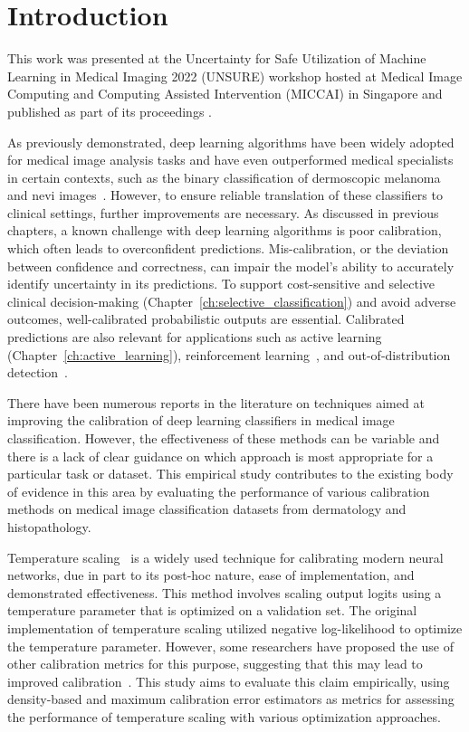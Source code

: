 \section{Introduction}
\label{sec:calibration_introduction}
This work was presented at the Uncertainty for Safe Utilization of Machine Learning in Medical Imaging 2022 (UNSURE) workshop hosted at Medical Image Computing and Computing Assisted Intervention (MICCAI) in Singapore and published as part of its proceedings \citep{carse2022calibration}.

As previously demonstrated, deep learning algorithms have been widely adopted for medical image analysis tasks and have even outperformed medical specialists in certain contexts, such as the binary classification of dermoscopic melanoma and nevi images~\citep{maron2019systematic}. However, to ensure reliable translation of these classifiers to clinical settings, further improvements are necessary. As discussed in previous chapters, a known challenge with deep learning algorithms is poor calibration, which often leads to overconfident predictions. Mis-calibration, or the deviation between confidence and correctness, can impair the model's ability to accurately identify uncertainty in its predictions. To support cost-sensitive and selective clinical decision-making (Chapter~\ref{ch:selective_classification}) and avoid adverse outcomes, well-calibrated probabilistic outputs are essential. Calibrated predictions are also relevant for applications such as active learning (Chapter~\ref{ch:active_learning}), reinforcement learning~\citep{dai2020federated}, and out-of-distribution detection~\citep{ulmer2020trust}.

There have been numerous reports in the literature on techniques aimed at improving the calibration of deep learning classifiers in medical image classification. However, the effectiveness of these methods can be variable and there is a lack of clear guidance on which approach is most appropriate for a particular task or dataset. This empirical study contributes to the existing body of evidence in this area by evaluating the performance of various calibration methods on medical image classification datasets from dermatology and histopathology.

Temperature scaling~\cite{guo2017calibration} is a widely used technique for calibrating modern neural networks, due in part to its post-hoc nature, ease of implementation, and demonstrated effectiveness. This method involves scaling output logits using a temperature parameter that is optimized on a validation set. The original implementation of temperature scaling utilized negative log-likelihood to optimize the temperature parameter. However, some researchers have proposed the use of other calibration metrics for this purpose, suggesting that this may lead to improved calibration~\cite{mukhoti2020calibrating,frenkel2021network}. This study aims to evaluate this claim empirically, using density-based and maximum calibration error estimators as metrics for assessing the performance of temperature scaling with various optimization approaches.

